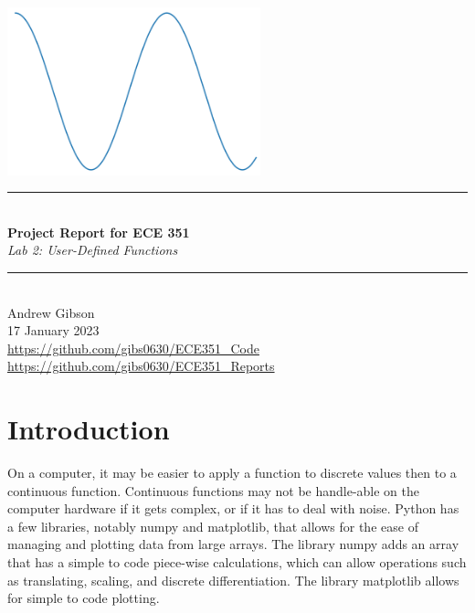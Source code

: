 \documentclass[12pt,a4paper]{article}
\newcommand{\HRule}{\rule{\linewidth}{0.5mm}}
\begin{document}
\begin{titlepage}
\begin{center}
\includegraphics[width=0.55\textwidth]{titlepage_image.png}~\\[2cm]
\HRule \\[0.4cm]
{ \LARGE 
  \textbf{Project Report for ECE 351}\\[0.4cm]
  \emph{Lab 2: User-Defined Functions}\\[0.4cm]
}
\HRule \\[1.5cm]
{ \large
  Andrew Gibson \\[0.1cm]
  17 January 2023\\[0.1cm]
  \url{https://github.com/gibs0630/ECE351\_Code}\\[0.1cm]
  \url{https://github.com/gibs0630/ECE351\_Reports}\\[0.1cm]
}
\vfill
{\large }
 
\end{center}
\end{titlepage}
\newpage
\tableofcontents
{}
\newpage
\setcounter{page}{1}
\section{Introduction}\label{sec:intro}
On a computer, it may be easier to apply a function to discrete values then to a continuous function.  Continuous functions may not be handle-able on the computer hardware if it gets complex, or if it has to deal with noise. Python has a few libraries, notably numpy and matplotlib, that allows for the ease of managing and plotting data from large arrays.  The library numpy adds an array that has a simple to code piece-wise calculations, which can allow operations such as translating, scaling, and discrete differentiation.  The library matplotlib allows for simple to code plotting.
\end{document}
